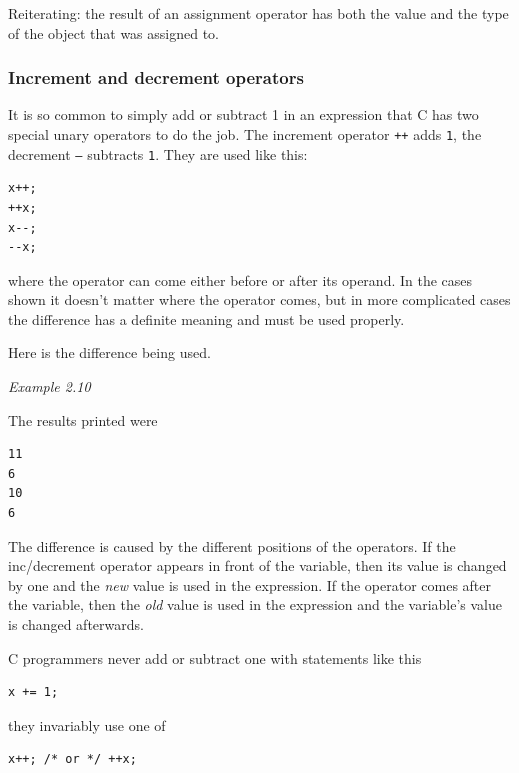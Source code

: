     Reiterating: the result of an assignment operator has both the value
     and the type of the object that was assigned to.


   

   \subsubsection{Increment and decrement operators}
    

    It is so common to simply add or subtract 1 in an expression that C has
     two special unary operators to do the job. The increment
     operator \texttt{++} adds \texttt{1}, the
     decrement \texttt{--} subtracts \texttt{1}. They are
     used like this:


    \begin{Verbatim}
x++;
++x;
x--;
--x;
\end{Verbatim}

    where the operator can come either before or after its operand. In the
     cases shown it doesn't matter where the operator comes, but in more
     complicated cases the difference has a definite meaning and must be used
     properly.


    Here is the difference being used.


    \begin{center}\textit{Example 2.10}\end{center}


    The results printed were


    \begin{Verbatim}
11
6
10
6
\end{Verbatim}

    The difference is caused by the different positions of the operators.
     If the inc/decrement operator appears in front of the variable, then its
     value is changed by one and the \textit{new} value is used in the
     expression. If the operator comes after the variable, then the
     \textit{old} value is used in the expression and the variable's value is
     changed afterwards.


    C programmers never add or subtract one with statements like this


    \begin{Verbatim}
x += 1;
\end{Verbatim}

    they invariably use one of


    \begin{Verbatim}
x++; /* or */ ++x;
\end{Verbatim}

